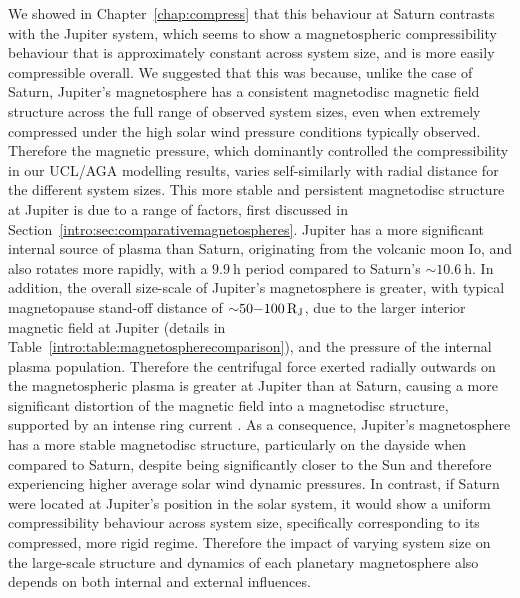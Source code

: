 We showed in Chapter~\ref{chap:compress} that this behaviour at Saturn contrasts with the Jupiter system, which seems to show a magnetospheric compressibility behaviour that is approximately constant across system size, and is more easily compressible overall. We suggested that this was because, unlike the case of Saturn, Jupiter's magnetosphere has a consistent magnetodisc magnetic field structure across the full range of observed system sizes, even when extremely compressed under the high solar wind pressure conditions typically observed. Therefore the magnetic pressure, which dominantly controlled the compressibility in our UCL/AGA modelling results, varies self-similarly with radial distance for the different system sizes. This more stable and persistent magnetodisc structure at Jupiter is due to a range of factors, first discussed in Section~\ref{intro:sec:comparativemagnetospheres}. Jupiter has a more significant internal source of plasma than Saturn, originating from the volcanic moon Io, and also rotates more rapidly, with a $\SI{9.9}{\hour}$ period compared to Saturn's  ${\sim}\SI{10.6}{\hour}$. In addition, the overall size-scale of Jupiter's magnetosphere is  greater, with typical magnetopause stand-off distance of ${\sim}50{\--}\SI{100}{R_J}$, due to the larger interior magnetic field at Jupiter (details in Table~\ref{intro:table:magnetospherecomparison}), and the pressure of the internal plasma population. Therefore the centrifugal force exerted radially outwards on the magnetospheric plasma is greater at Jupiter than at Saturn, causing a more significant distortion of the magnetic field into a magnetodisc structure, supported by an intense ring current \citep[e.g.][]{khurana2004}. As a consequence, Jupiter's magnetosphere has a more stable magnetodisc structure, particularly on the dayside when compared to Saturn, despite being significantly closer to the Sun and therefore experiencing higher average solar wind dynamic pressures. In contrast, if Saturn were located at Jupiter's position in the solar system, it would show a uniform compressibility behaviour across system size, specifically corresponding to its compressed, more rigid regime. Therefore the impact of varying system size on the large-scale structure and dynamics of each planetary magnetosphere also depends on both internal and external influences.

